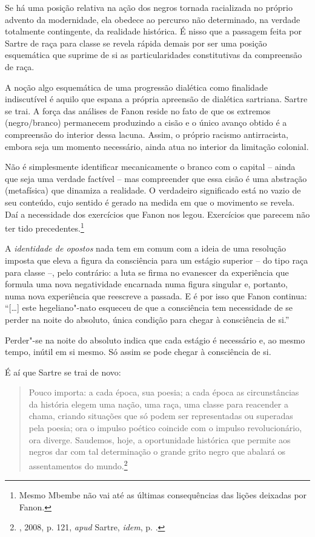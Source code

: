 Se há uma posição relativa na ação dos negros tornada racializada no
próprio advento da modernidade, ela obedece ao percurso não determinado,
na verdade totalmente contingente, da realidade histórica. É nisso que a
passagem feita por Sartre de raça para classe se revela rápida demais
por ser uma posição esquemática que suprime de si as particularidades
constitutivas da compreensão de raça.

A noção algo esquemática de uma progressão dialética como finalidade
indiscutível é aquilo que espana a própria apreensão de dialética
sartriana. Sartre se trai. A força das análises de Fanon reside no fato
de que os extremos (negro/branco) permanecem produzindo a cisão e o
único avanço obtido é a compreensão do interior dessa lacuna. Assim, o
próprio racismo antirracista, embora seja um momento necessário, ainda
atua no interior da limitação colonial.

Não é simplesmente identificar mecanicamente o branco com o capital --
ainda que seja uma verdade factível -- mas compreender que essa cisão é
uma abstração (metafísica) que dinamiza a realidade. O verdadeiro
significado está no vazio de seu conteúdo, cujo sentido é gerado na
medida em que o movimento se revela. Daí a necessidade dos exercícios
que Fanon nos legou. Exercícios que parecem não ter tido
precedentes.\footnote{Mesmo Mbembe não vai até as últimas consequências
  das lições deixadas por Fanon.}

A \emph{identidade de opostos} nada tem em comum com a ideia de uma
resolução imposta que eleva a figura da consciência para um estágio
superior -- do tipo raça para classe --, pelo contrário: a luta se firma
no evanescer da experiência que formula uma nova negatividade encarnada
numa figura singular e, portanto, numa nova experiência que reescreve a
passada. E é por isso que Fanon continua: ``{[}\ldots{}{]}
este hegeliano"-nato esqueceu de
que a consciência tem necessidade de se perder na noite do absoluto,
única condição para chegar à consciência de si.''

Perder"-se na noite do absoluto indica que cada
estágio é necessário e, ao mesmo
tempo, inútil em si mesmo. Só assim se pode chegar à consciência de si.

É aí que Sartre se trai de novo:

\begin{quote}
Pouco importa: a cada época, sua poesia; a cada época as circunstâncias
da história elegem uma nação, uma raça, uma classe para reacender a
chama, criando situações que só podem ser representadas ou superadas
pela poesia; ora o impulso poético coincide com o impulso
revolucionário, ora diverge. Saudemos, hoje, a oportunidade histórica
que permite aos negros dar com tal determinação o grande grito negro
que abalará os assentamentos do mundo.\footnote{, 2008, p. 121, \emph{apud}
  Sartre, \emph{idem}, p. .}
\end{quote}

